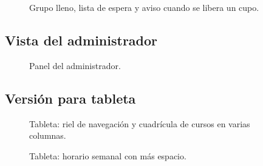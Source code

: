 \begin{figure}[H]
\centering
{}\hspace{0.04\textwidth}
\hspace{0.04\textwidth}
\caption{Grupo lleno, lista de espera y aviso cuando se libera un cupo.}
\end{figure}

\subsection{Vista del administrador}
\begin{figure}[H]
\centering
{}
\caption{Panel del administrador.}
\end{figure}

\subsection{Versión para tableta}
\begin{figure}[H]\centering{}\caption{Tableta: riel de navegación y cuadrícula de cursos en varias columnas.}\end{figure}
\begin{figure}[H]\centering{}\caption{Tableta: horario semanal con más espacio.}\end{figure}
